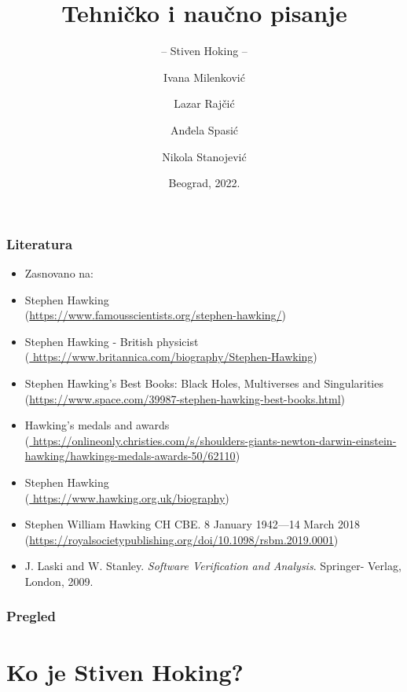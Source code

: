 \documentclass{beamer}
\title{Tehničko i naučno pisanje}
\subtitle{-- Stiven Hoking --}
\author{ Ivana Milenković\\ \and Lazar Rajčić\\ \and Anđela Spasić\\ \and Nikola Stanojević }
\institute{Matematički fakultet\\Univerzitet u Beogradu}
\date{
	\footnotesize{Beograd, 2022.}	
}
\begin{document}
\begin{frame}
	\thispagestyle{empty}
	\titlepage
\end{frame}

\addtocounter{framenumber}{-1}

\begin{frame}[fragile]\frametitle{Literatura}
	\begin{itemize} \fontsize{9}{6}\selectfont
		\item Zasnovano na:\\

	\item Stephen Hawking
	     \\ (\url{https://www.famousscientists.org/stephen-hawking/})
        \item  Stephen Hawking - British physicist
           \\ (\url{ https://www.britannica.com/biography/Stephen-Hawking})
        \item Stephen Hawking's Best Books: Black Holes, Multiverses and Singularities
           \\(\url{https://www.space.com/39987-stephen-hawking-best-books.html})
        \item Hawking's medals and awards
            \\(\url{ https://onlineonly.christies.com/s/shoulders-giants-newton-darwin-einstein-hawking/hawkings-medals-awards-50/62110})
       \item  Stephen Hawking
            \\(\url{ https://www.hawking.org.uk/biography})
        \item Stephen William Hawking CH CBE. 8 January 1942—14 March 2018
           \\ (\url{https://royalsocietypublishing.org/doi/10.1098/rsbm.2019.0001})
        \item J. Laski and W. Stanley. \emph{Software Verification and Analysis}. Springer- Verlag, London, 2009.
     \fontsize{6pt}{1pt}\selectfont
	\end{itemize}
\end{frame}

\begin{frame} \fontsize{9}{6}\selectfont
	\frametitle{Pregled} %
	\tableofcontents[hidesubsections] 
\end{frame}
\section{Ko je Stiven Hoking?}
\end{document}
